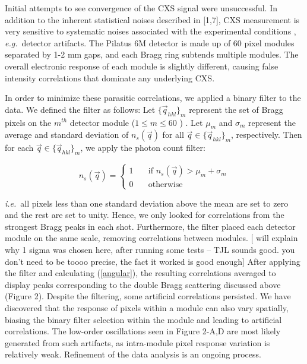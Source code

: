 \documentclass [11pt,fleqn]{article}
\begin{document}
Initial attempts to see convergence of the CXS signal were unsuccessful. In addition to the inherent statistical noises described in [1,7], CXS measurement  is very sensitive to systematic noises associated with the experimental conditions \cite{Kam:1981ua}, \textit{e.g.}~detector artifacts. The Pilatus 6M detector is made up of 60 pixel modules separated by 1-2 mm gaps, and each Bragg ring subtends multiple modules. The overall electronic response of each module is slightly different, causing false intensity correlations that dominate any underlying CXS. 

In order to minimize these parasitic correlations, we applied a binary filter to the data. We defined the filter as follows: Let $\{ \vec{q}_{hkl} \}_{m}$ represent the set of Bragg pixels on the $m^{th}$ detector module ($1 \leq m \leq 60$ ) . Let $\mu_m$ and $\sigma_m$ represent the average and standard deviation of $n_{s}(\vec{q})$  for all $\vec{q} \in \{ \vec{q}_{hkl} \}_{m} $, respectively. Then for each $\vec{q} \in \{ \vec{q}_{hkl} \}_{m} $, we apply the photon count filter:

\[  n_{s}(\vec{q} ) = 
 \begin{cases} 
   1 & \quad \text{if } n_{s}(\vec{q} ) > \mu_m +  \sigma_m\\
   0 & \quad \text{otherwise} 
 \end{cases} 
 \]

\textit{i.e.}~all pixels less than one standard deviation above the mean are set to zero and the rest are set to unity. Hence, we only looked for correlations from the strongest Bragg peaks in each shot. Furthermore, the filter placed each detector module on the same scale, removing correlations between modules. [  will explain why 1 sigma was chosen here, after running some tests -- TJL sounds good. you don't need to be toooo precise, the fact it worked is good enough]  After applying the filter and calculating (\ref{angular}), the resulting correlations averaged to display peaks corresponding to the double Bragg scattering discussed above (Figure 2). Despite the filtering, some artificial correlations persisted. We have discovered that the response of pixels within a module can also vary spatially, biasing the binary filter selection within the module and leading to artificial correlations. The low-order oscillations seen in Figure 2-A,D are most likely generated from such artifacts, as intra-module pixel response variation is relatively weak. Refinement of the data analysis is an ongoing process.
\end{document}
